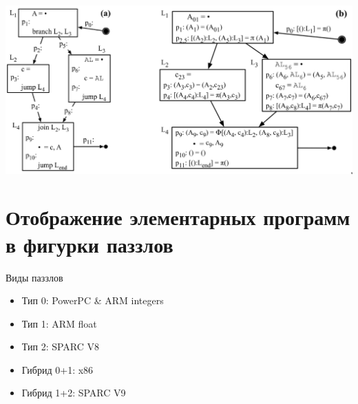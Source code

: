 \documentclass[aspectratio=169
  , xcolor={svgnames}
  , hyperref={ colorlinks,citecolor=DeepPink4
             , linkcolor=DarkRed,urlcolor=DarkBlue}
  , russian
  ]{beamer}
\theoremstyle{exerciseStyle1}
\begin{document}
\begin{frame}[fragile]{}
\begin{center}
\includegraphics[width=1\linewidth]{figures/elementare-form-example}
\end{center}

\end{frame}

\section{Отображение элементарных программ в фигурки паззлов}

\begin{frame}[fragile]{Виды паззлов}
\begin{minipage}{.32\textwidth}
\begin{itemize}
\item Тип 0: PowerPC \& ARM integers
\item Тип 1: ARM float
\item Тип 2: SPARC V8
\item Гибрид 0+1: x86
\item Гибрид 1+2: SPARC V9
\end{itemize}

\end{minipage}
\end{frame}
\end{document}
